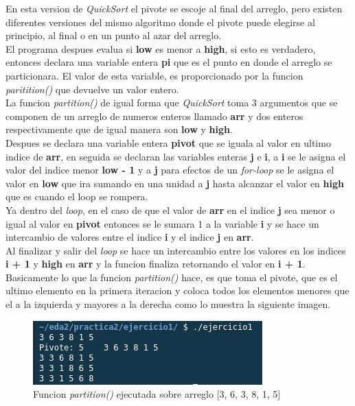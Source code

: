 \documentclass{article}
\begin{document}
				En esta version de \emph{QuickSort} el pivote se escoje al final del arreglo, pero existen diferentes versiones del mismo algoritmo donde el pivote puede elegirse al principio, al final o en un punto al azar del arreglo.\\
				
				El programa despues evalua si \textbf{low} es menor a \textbf{high}, si esto es verdadero, entonces declara una variable entera \textbf{pi} que es el punto en donde el arreglo se particionara. El valor de esta variable, es proporcionado por la funcion \emph{paritition()} que devuelve un valor entero.\\
				
				La funcion \emph{partition()} de igual forma que \emph{QuickSort} toma 3 argumentos que se componen de un arreglo de numeros enteros llamado \textbf{arr} y dos enteros respectivamente que de igual manera son \textbf{low} y \textbf{high}.\\
				
				Despues se declara una variable entera \textbf{pivot} que se iguala al valor en ultimo indice de \textbf{arr}, en seguida se declaran las variables enteras \textbf{j} e \textbf{i}, a \textbf{i} se le asigna el valor del indice menor \textbf{low - 1} y a \textbf{j} para efectos de un \emph{for-loop} se le asigna el valor en \textbf{low} que ira sumando en una unidad a \textbf{j} hasta alcanzar el valor en \textbf{high} que es cuando el loop se rompera.\\
				
				Ya dentro del \emph{loop}, en el caso de que el valor de \textbf{arr} en el indice \textbf{j} sea menor o igual al valor en \textbf{pivot} entonces se le sumara 1 a la variable \textbf{i} y se hace un intercambio de valores entre el indice \textbf{i} y el indice \textbf{j} en \textbf{arr}.\\
				
				Al finalizar y salir del \emph{loop} se hace un intercambio entre los valores en los indices \textbf{i + 1} y \textbf{high} en \textbf{arr} y la funcion finaliza retornando el valor en \textbf{i + 1}.\\
				
				Basicamente lo que la funcion \emph{partition()} hace, es que toma el pivote, que es el ultimo elemento en la primera iteracion y coloca todos los elementos menores que el a la izquierda y mayores a la derecha como lo muestra la siguiente imagen.\\
				
				\begin{figure}[H]
					\centering
					\includegraphics{images/partition1.png}
					\caption{Funcion \emph{partition()} ejecutada sobre arreglo [3, 6, 3, 8, 1, 5]}
				\end{figure} 
			
\end{document}
